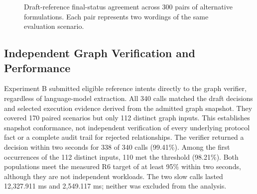 \begin{figure}[H]
\centering
{}
\caption{Draft-reference final-status agreement across 300 pairs of
alternative formulations. Each pair represents two wordings of the
same evaluation scenario.}
\label{fig:results_pairs}
\end{figure}

\subsection{Independent Graph Verification and Performance}
\label{sec:results_graph_latency}

Experiment B submitted eligible reference intents directly to the graph
verifier, regardless of language-model extraction. All 340 calls matched
the draft decisions and selected execution evidence derived from the
admitted graph snapshot. They covered 170 paired scenarios but only
112 distinct graph inputs. This establishes snapshot conformance, not
independent verification of every underlying protocol fact or a complete
audit trail for rejected relationships. The verifier returned a decision within two seconds for 338 of 340 calls
(99.41\%). Among the first occurrences of the 112 distinct inputs,
110 met the threshold (98.21\%). Both populations meet the measured
R6 target of at least 95\% within two seconds, although they are not
independent workloads. The two slow calls lasted 12,327.911 ms and
2,549.117 ms; neither was excluded from the analysis. 

